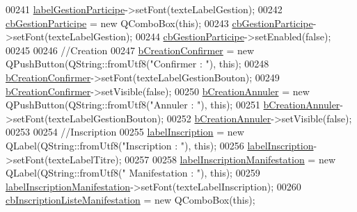 \begin{DoxyCode}
00241     \hyperlink{class_i_h_m_gestion_cross_a0106cdcaf86997642d48dfad96a2368f}{labelGestionParticipe}->setFont(texteLabelGestion);
00242     \hyperlink{class_i_h_m_gestion_cross_a89aff3b1c5d5198dd7aaecd932331e0d}{cbGestionParticipe} = \textcolor{keyword}{new} QComboBox(\textcolor{keyword}{this});
00243     \hyperlink{class_i_h_m_gestion_cross_a89aff3b1c5d5198dd7aaecd932331e0d}{cbGestionParticipe}->setFont(texteLabelGestion);
00244     \hyperlink{class_i_h_m_gestion_cross_a89aff3b1c5d5198dd7aaecd932331e0d}{cbGestionParticipe}->setEnabled(\textcolor{keyword}{false});
00245 
00246     \textcolor{comment}{//Creation}
00247     \hyperlink{class_i_h_m_gestion_cross_aac8a7363e20bc9ba2f65b7d9b3bc856e}{bCreationConfirmer} = \textcolor{keyword}{new} QPushButton(QString::fromUtf8(\textcolor{stringliteral}{"Confirmer : "}), \textcolor{keyword}{this});
00248     \hyperlink{class_i_h_m_gestion_cross_aac8a7363e20bc9ba2f65b7d9b3bc856e}{bCreationConfirmer}->setFont(texteLabelGestionBouton);
00249     \hyperlink{class_i_h_m_gestion_cross_aac8a7363e20bc9ba2f65b7d9b3bc856e}{bCreationConfirmer}->setVisible(\textcolor{keyword}{false});
00250     \hyperlink{class_i_h_m_gestion_cross_a297a77054dc0f54e461c0f9b0382efb3}{bCreationAnnuler} = \textcolor{keyword}{new} QPushButton(QString::fromUtf8(\textcolor{stringliteral}{"Annuler : "}), \textcolor{keyword}{this});
00251     \hyperlink{class_i_h_m_gestion_cross_a297a77054dc0f54e461c0f9b0382efb3}{bCreationAnnuler}->setFont(texteLabelGestionBouton);
00252     \hyperlink{class_i_h_m_gestion_cross_a297a77054dc0f54e461c0f9b0382efb3}{bCreationAnnuler}->setVisible(\textcolor{keyword}{false});
00253 
00254     \textcolor{comment}{//Inscription}
00255     \hyperlink{class_i_h_m_gestion_cross_a58c321e2d95796d99e70a05260b8aff3}{labelInscription} = \textcolor{keyword}{new} QLabel(QString::fromUtf8(\textcolor{stringliteral}{"Inscription : "}), \textcolor{keyword}{this});
00256     \hyperlink{class_i_h_m_gestion_cross_a58c321e2d95796d99e70a05260b8aff3}{labelInscription}->setFont(texteLabelTitre);
00257 
00258     \hyperlink{class_i_h_m_gestion_cross_affb681e48eb407d5d69d1ecb24da8377}{labelInscriptionManifestation} = \textcolor{keyword}{new} QLabel(QString::fromUtf8(\textcolor{stringliteral}{"
      Manifestation : "}), \textcolor{keyword}{this});
00259     \hyperlink{class_i_h_m_gestion_cross_affb681e48eb407d5d69d1ecb24da8377}{labelInscriptionManifestation}->setFont(texteLabelInscription);
00260     \hyperlink{class_i_h_m_gestion_cross_a317ffd7cc1c9aa5d6e55c53568e44f98}{cbInscriptionListeManifestation} = \textcolor{keyword}{new} QComboBox(\textcolor{keyword}{this});

\end{DoxyCode}
